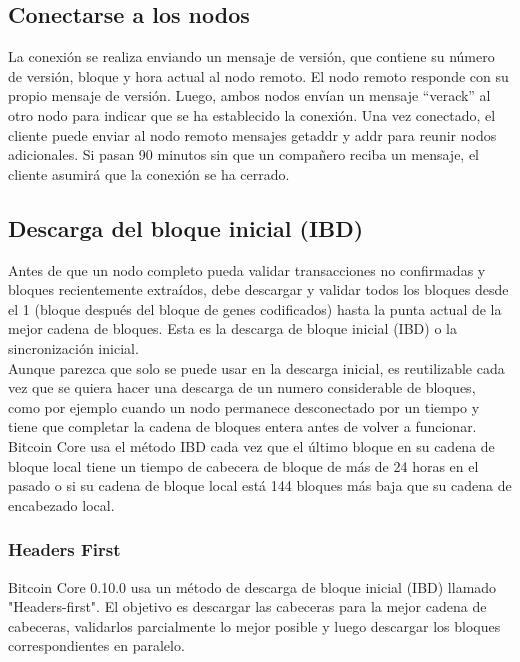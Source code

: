 \documentclass[11pt,a4paper]{article}
\begin{document}
\subsection{Conectarse a los nodos}

La conexión se realiza enviando un mensaje de versión, que contiene su número de versión, bloque y hora actual al nodo remoto. El nodo remoto responde con su propio mensaje de versión. Luego, ambos nodos envían un mensaje ``verack'' al otro nodo para indicar que se ha establecido la conexión. Una vez conectado, el cliente puede enviar al nodo remoto mensajes getaddr y addr para reunir nodos adicionales. Si pasan 90 minutos sin que un compañero reciba un mensaje, el cliente asumirá que la conexión se ha cerrado.

\subsection{Descarga del bloque inicial (IBD)}

Antes de que un nodo completo pueda validar transacciones no confirmadas y bloques recientemente extraídos, debe descargar y validar todos los bloques desde el 1 (bloque después del bloque de genes codificados) hasta la punta actual de la mejor cadena de bloques. Esta es la descarga de bloque inicial (IBD) o la sincronización inicial.\\

Aunque parezca que solo se puede usar en la descarga inicial, es reutilizable cada vez que se quiera hacer una descarga de un numero considerable de bloques, como por ejemplo cuando un nodo permanece desconectado por un tiempo y tiene que completar la cadena de bloques entera antes de volver a funcionar.\\

Bitcoin Core usa el método IBD cada vez que el último bloque en su cadena de bloque local tiene un tiempo de cabecera de bloque de más de 24 horas en el pasado o si su cadena de bloque local está 144 bloques más baja que su cadena de encabezado local.

\subsubsection{Headers First}

Bitcoin Core 0.10.0 usa un método de descarga de bloque inicial (IBD) llamado "Headers-first". El objetivo es descargar las cabeceras para la mejor cadena de cabeceras, validarlos parcialmente lo mejor posible y luego descargar los bloques correspondientes en paralelo.\\
\end{document}
